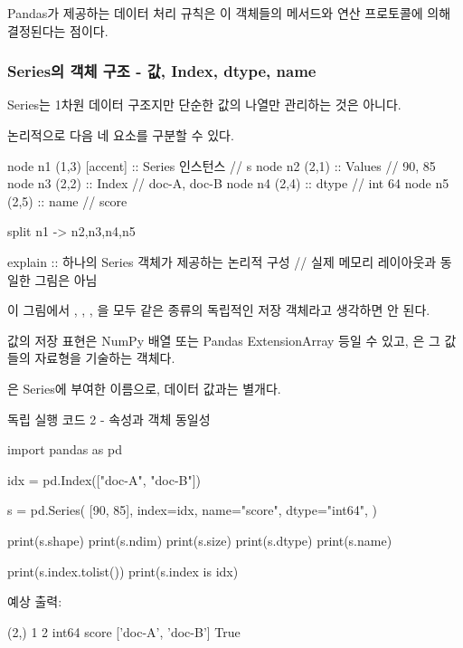 Pandas가 제공하는 데이터 처리 규칙은 이 객체들의 메서드와 연산 프로토콜에 의해 결정된다는 점이다.

\subsubsection{Series의 객체 구조 - 값, Index, dtype, name}

Series는 1차원 데이터 구조지만 단순한 값의 나열만 관리하는 것은 아니다.

논리적으로 다음 네 요소를 구분할 수 있다.

\begin{dhkgraph}[uniform]
node n1 (1,3) [accent] :: Series 인스턴스 // s
node n2 (2,1) :: Values // 90, 85
node n3 (2,2) :: Index // doc-A, doc-B
node n4 (2,4) :: dtype // int 64
node n5 (2,5) :: name // score

split n1 -> n2,n3,n4,n5

explain :: 하나의 Series 객체가 제공하는 논리적 구성 // 실제 메모리 레이아웃과 동일한 그림은 아님
\end{dhkgraph}

이 그림에서 , , , 을 모두 같은 종류의 독립적인 저장 객체라고 생각하면 안 된다.

값의 저장 표현은 NumPy 배열 또는 Pandas ExtensionArray 등일 수 있고, 은 그 값들의 자료형을 기술하는 객체다.

은 Series에 부여한 이름으로, 데이터 값과는 별개다.

\begin{dhknote}
\begin{dhksmry}[centered]
독립 실행 코드 2 - 속성과 객체 동일성
\end{dhksmry}
\end{dhknote}

\begin{dhkcode}
import pandas as pd

idx = pd.Index(["doc-A", "doc-B"])

s = pd.Series(
    [90, 85],
    index=idx,
    name="score",
    dtype="int64",
)

print(s.shape)
print(s.ndim)
print(s.size)
print(s.dtype)
print(s.name)

print(s.index.tolist())
print(s.index is idx)
\end{dhkcode}

예상 출력:

\begin{dhkzsh}
(2,)
1
2
int64
score
['doc-A', 'doc-B']
True
\end{dhkzsh}

